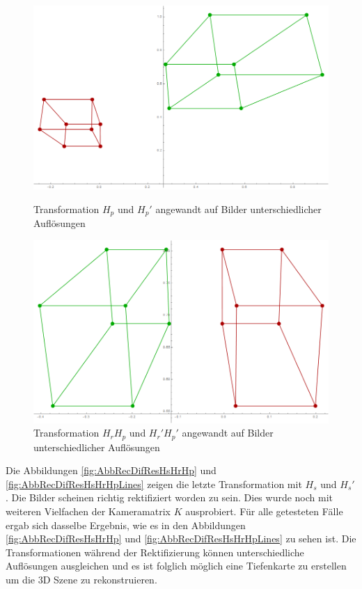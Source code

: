 \begin{figure}[!htb]
	\includegraphics[width=\linewidth]{images/Rectification_Hp_different_Solutions.png}
	\caption[Transformation $H_p$ und $H_p'$ angewandt auf Bilder unterschiedlicher Auflösungen]{Transformation $H_p$ und $H_p'$ angewandt auf Bilder unterschiedlicher Auflösungen}
	\label{fig:AbbRecDifResHp}
	\endminipage\hfill
	\includegraphics[width=\linewidth]{images/Rectification_HrHp_different_Solutions.png}
	\caption[Transformation $H_rH_p$ und $H_r'H_p'$ angewandt auf Bilder unterschiedlicher Auflösungen]{Transformation $H_rH_p$ und $H_r'H_p'$ angewandt auf Bilder unterschiedlicher Auflösungen}
	\label{fig:AbbRecDifResHrHp}
	\endminipage\hfill
\end{figure}

Die Abbildungen \ref{fig:AbbRecDifResHsHrHp} und \ref{fig:AbbRecDifResHsHrHpLines} zeigen die letzte Transformation mit $H_s$ und $H_s'$. Die Bilder scheinen richtig rektifiziert worden zu sein. Dies wurde noch mit weiteren Vielfachen der Kameramatrix $K$ ausprobiert. Für alle getesteten Fälle ergab sich dasselbe Ergebnis, wie es in den Abbildungen \ref{fig:AbbRecDifResHsHrHp} und \ref{fig:AbbRecDifResHsHrHpLines} zu sehen ist. Die Transformationen während der Rektifizierung können unterschiedliche Auflösungen ausgleichen und es ist folglich möglich eine Tiefenkarte zu erstellen um die 3D Szene zu rekonstruieren. 

